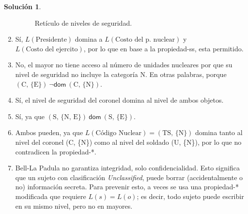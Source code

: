 \documentclass{article}
\theoremstyle{definition}
\newtheorem{soln}{Solución}
\begin{document}
\begin{soln}
\begin{enumerate}
\begin{figure}[htp]
  \caption{Retículo de niveles de seguridad.\label{fig:lattice} }
\end{figure}
  \item Sí, $L(\text{Presidente})$ domina a $L(\text{Costo del p.\ nuclear})$ y
    $L(\text{Costo del ejercito})$, por lo que en base a la propiedad-ss, esta
    permitido.
\item No, el mayor no tiene acceso al número de unidades nucleares por que su
  nivel de seguridad no incluye la categoría N. En otras palabras, porque 
  $(\text{C, \{E\}})~\neg\mathsf{dom}~(\text{C, \{N\}})$.
\item Sí, el nivel de seguridad del coronel domina al nivel de ambos objetos.
\item Sí, ya que $(\text{S, \{N, E\}})~\mathsf{dom}~(\text{S, \{E\}})$.
\item Ambos pueden, ya que $L(\text{Código Nuclear}) = (\text{TS, \{N\}})$
  domina tanto al nivel del coronel (C, \{N\}) como al nivel del soldado (U,
  \{N\}), por lo que no contradicen la propiedad-*.
\item Bell-La Padula no garantiza integridad, solo confidencialidad. Esto
  significa que un sujeto con clasificación \textit{Unclassified}, puede borrar
  (accidentalmente o no) información secreta. Para prevenir esto, a veces se
  usa una propiedad-* modificada que requiere $L(s) = L(o)$; es decir, todo
  sujeto puede escribir en su mismo nivel, pero no en mayores.
\end{enumerate}
\end{soln}
\end{document}

